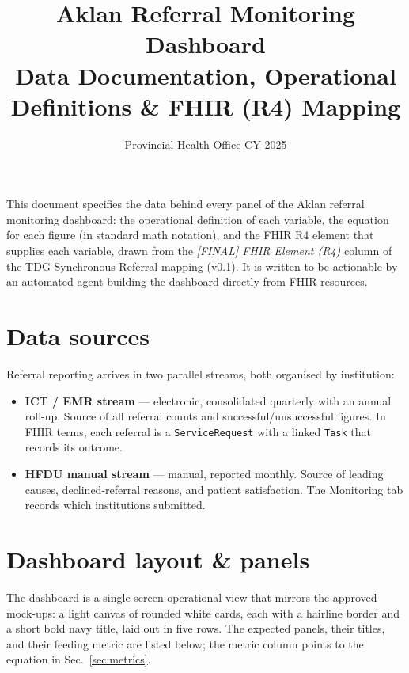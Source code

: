 \documentclass[11pt]{article}
\title{\textbf{\color{navy}Aklan Referral Monitoring Dashboard}\\[2pt]
\large Data Documentation, Operational Definitions \& FHIR (R4) Mapping}
\author{Provincial Health Office \quad\textbullet\quad CY 2025}
\date{}
\newcommand{\fhir}[1]{\texttt{#1}}
\begin{document}
\maketitle
\vspace{-1.5em}

\noindent This document specifies the data behind every panel of the Aklan referral monitoring dashboard: the operational definition of each variable, the equation for each figure (in standard math notation), and the FHIR R4 element that supplies each variable, drawn from the \emph{[FINAL] FHIR Element (R4)} column of the TDG Synchronous Referral mapping (v0.1). It is written to be actionable by an automated agent building the dashboard directly from FHIR resources.

\section{Data sources}
Referral reporting arrives in two parallel streams, both organised by institution:
\begin{itemize}
  \item \textbf{ICT / EMR stream} --- electronic, consolidated quarterly with an annual roll-up. Source of all referral counts and successful/unsuccessful figures. In FHIR terms, each referral is a \fhir{ServiceRequest} with a linked \fhir{Task} that records its outcome.
  \item \textbf{HFDU manual stream} --- manual, reported monthly. Source of leading causes, declined-referral reasons, and patient satisfaction. The Monitoring tab records which institutions submitted.
\end{itemize}

\section{Dashboard layout \& panels}\label{sec:panels}
The dashboard is a single-screen operational view that mirrors the approved mock-ups: a light canvas of rounded white cards, each with a hairline border and a short bold navy title, laid out in five rows. The expected panels, their titles, and their feeding metric are listed below; the metric column points to the equation in Sec.~\ref{sec:metrics}.
\end{document}
